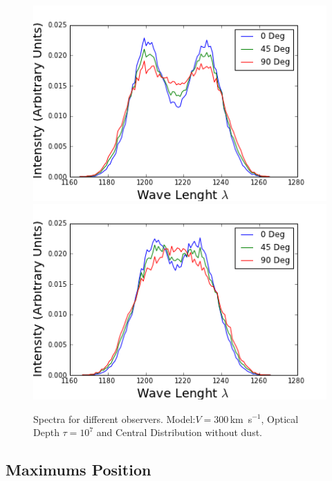 \documentclass[usenatbib]{mn2e}
\newcommand{\kms}{\,km~s$^{-1}$}
\begin{document}
\begin{figure}
\includegraphics[scale=0.45]{Observers7t.png}
\includegraphics[scale=0.45]{Observers7tHOM.png}
\caption{Spectra for different observers. Model:$V=300$\kms, Optical
  Depth $\tau=10^{7}$ and Central Distribution without dust.} 
  \label{fig:DifferentObservers}
\end{figure}


\subsection{Maximums Position}
\label{sec:MP}
\end{document}
